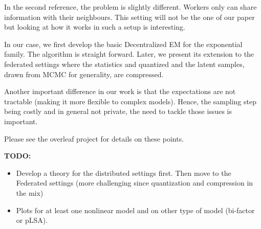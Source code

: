 \documentclass{article}
\begin{document}
In the second reference, the problem is slightly different. Workers only can share information with their neighbours.
This setting will not be the one of our paper but looking at how it works in such a setup is interesting.

In our case, we first develop the basic Decentralized EM for the exponential family. The algorithm is straight forward.
Later, we present its extension to the federated settings where the statistics and quantized and the latent samples, drawn from MCMC for generality, are compressed.

Another important difference in our work is that the expectations are not tractable (making it more flexible to complex models). Hence, the sampling step being costly and in general not private, the need to tackle those issues is important.

Please see the overleaf project for details on these points.


\textbf{TODO:}
\begin{itemize}
\item Develop a theory for the distributed settings first. Then move to the Federated settings (more challenging since quantization and compression in the mix)
\item Plots for at least one nonlinear model and on other type of model (bi-factor or pLSA).
\end{itemize}





\end{document}
